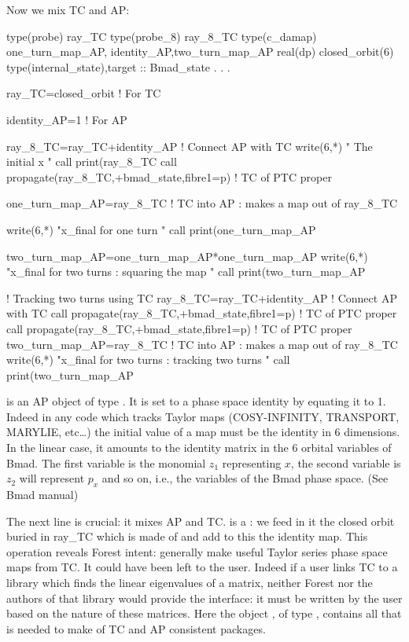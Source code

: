 \documentclass{hitec}     %
\begin{document}
{{Now we mix TC and AP:
 \begin{code}
type(probe) ray_TC 
type(probe_8) ray_8_TC
type(c_damap)  one_turn_map_AP, identity_AP,two_turn_map_AP
real(dp)  closed_orbit(6)
type(internal_state),target :: Bmad_state
   .
   .
   .

ray_TC=closed_orbit   !  For TC

identity_AP=1  !  For AP

ray_8_TC=ray_TC+identity_AP   ! Connect AP with TC
write(6,*) " The initial x "
call print(ray_8_TC%
call propagate(ray_8_TC,+bmad_state,fibre1=p) ! TC of PTC proper

one_turn_map_AP=ray_8_TC ! TC into AP : makes a map out of ray_8_TC

write(6,*) "x_final for one turn "
call print(one_turn_map_AP%

two_turn_map_AP=one_turn_map_AP*one_turn_map_AP
write(6,*) "x_final for two turns : squaring the map "
call print(two_turn_map_AP%

!  Tracking two turns using TC
ray_8_TC=ray_TC+identity_AP   ! Connect AP with TC
call propagate(ray_8_TC,+bmad_state,fibre1=p) ! TC of PTC proper
call propagate(ray_8_TC,+bmad_state,fibre1=p) ! TC of PTC proper
two_turn_map_AP=ray_8_TC ! TC into AP : makes a map out of ray_8_TC
write(6,*) "x_final for two turns : tracking two turns "
call print(two_turn_map_AP%
\end{code}

 is an AP object of type . It is set to a phase space identity by equating it to 1. Indeed in any code which tracks Taylor maps (COSY-INFINITY, TRANSPORT, MARYLIE, etc\ldots) the initial value of a map must be the identity in 6 dimensions. In the linear case, it amounts to the identity matrix in the 6 orbital variables of Bmad. The first variable is the monomial $z_1$ representing $x$, the second variable is $z_2$ will represent $p_x$ and so on, i.e., the variables of the Bmad phase space. (See Bmad manual)

The next line is crucial: it mixes AP and TC.  is a : we feed in it the closed orbit buried in ray_TC which is made of  and add to this the identity map. This operation  reveals  Forest intent: generally make useful Taylor series phase space maps from TC. It could have been left to the user. Indeed if a user  links TC to a library which finds the linear eigenvalues of a matrix, neither Forest nor the authors of that library would provide the interface: it must be written by the user based on the nature of these matrices. Here the object , of type , contains all that is needed to make  of TC and AP  consistent packages. 

}}
\end{document}
